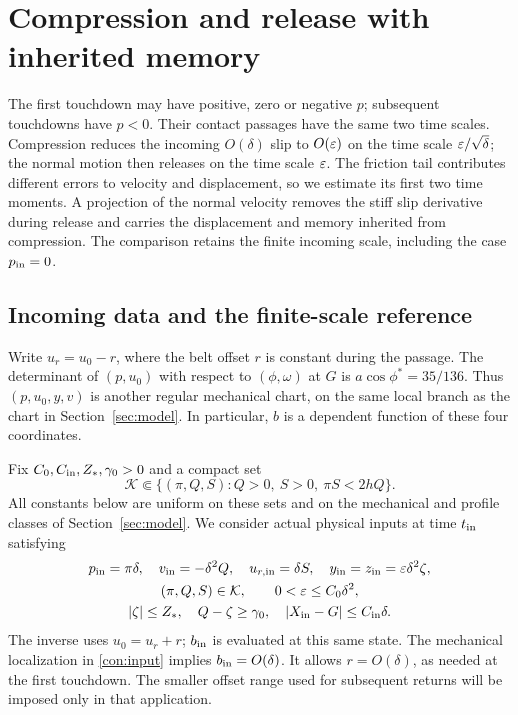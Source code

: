 \section{Compression and release with inherited memory}
\label{sec:contact}
The first touchdown may have positive, zero or negative $p$; subsequent
touchdowns have $p<0$.  Their contact passages have the same two time
scales.  Compression reduces the incoming $O(\delta)$ slip to
$O(\varepsilon)$ on the time scale $\varepsilon/\sqrt\delta$; the normal motion
then releases on the time scale $\varepsilon$.  The friction tail contributes
different errors to velocity and displacement, so we estimate its
first two time moments.  A projection of the normal velocity removes
the stiff slip derivative during release and carries the displacement
and memory inherited from compression.  The comparison retains the
finite incoming scale, including the case $p_{\rm in}=0$.

\subsection{Incoming data and the finite-scale reference}

Write $u_r=u_0-r$, where the belt offset $r$ is constant during the
passage.  The determinant of $(p,u_0)$ with respect to $(\phi,\omega)$
at $G$ is $a\cos\phi^*=35/136$.  Thus $(p,u_0,y,v)$ is another regular
mechanical chart, on the same local branch as the chart in
Section~\ref{sec:model}.  In particular, $b$ is a dependent function of
these four coordinates.

Fix $C_0,C_{\rm in},Z_*,\gamma_0>0$ and a compact set
\begin{equation}
 \mathcal K\Subset\{(\pi,Q,S):Q>0,\ S>0,\ \pi S<2hQ\}.
 \label{con:input-compact}
\end{equation}
All constants below are uniform on these sets and on the mechanical
and profile classes of Section~\ref{sec:model}.  We consider actual
physical inputs at time $t_{\rm in}$ satisfying
\begin{equation}
 \begin{gathered}
 p_{\rm in}=\pi\delta,\quad v_{\rm in}=-\delta^2Q,\quad
 u_{r,\rm in}=\delta S,\quad
 y_{\rm in}=z_{\rm in}=\varepsilon\delta^2\zeta,\\
 (\pi,Q,S)\in\mathcal K,\qquad 0<\varepsilon\le C_0\delta^2,\\
 |\zeta|\le Z_*,\quad Q-\zeta\ge\gamma_0,\quad
 |X_{\rm in}-G|\le C_{\rm in}\delta.
 \end{gathered}
 \label{con:input}
\end{equation}
The inverse uses $u_0=u_r+r$; $b_{\rm in}$ is evaluated at this same
state.  The mechanical localization in \eqref{con:input} implies
$b_{\rm in}=O(\delta)$.  It allows $r=O(\delta)$, as needed at the
first touchdown.  The smaller offset range used for subsequent returns
will be imposed only in that application.

